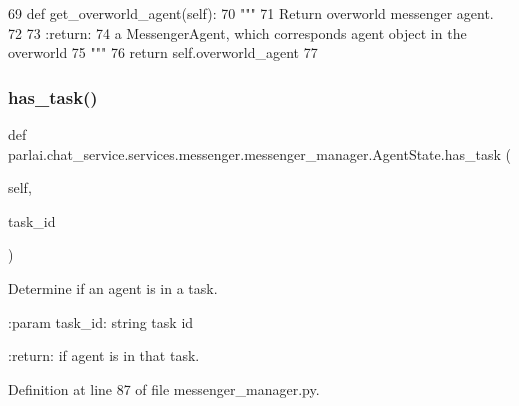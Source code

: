 \begin{DoxyCode}
69     \textcolor{keyword}{def }get\_overworld\_agent(self):
70         \textcolor{stringliteral}{"""}
71 \textcolor{stringliteral}{        Return overworld messenger agent.}
72 \textcolor{stringliteral}{}
73 \textcolor{stringliteral}{        :return:}
74 \textcolor{stringliteral}{            a MessengerAgent, which corresponds agent object in the overworld}
75 \textcolor{stringliteral}{        """}
76         \textcolor{keywordflow}{return} self.overworld\_agent
77 
\end{DoxyCode}
\mbox{\label{classparlai_1_1chat__service_1_1services_1_1messenger_1_1messenger__manager_1_1AgentState_a508037777019a09944a08bd3cc204dbb}} 
\subsubsection{\texorpdfstring{has\+\_\+task()}{has\_task()}}
{\footnotesize\ttfamily def parlai.\+chat\+\_\+service.\+services.\+messenger.\+messenger\+\_\+manager.\+Agent\+State.\+has\+\_\+task (\begin{DoxyParamCaption}\item[{}]{self,  }\item[{}]{task\+\_\+id }\end{DoxyParamCaption})}

\begin{DoxyVerb}Determine if an agent is in a task.

:param task_id:
    string task id

:return:
    if agent is in that task.
\end{DoxyVerb}
 

Definition at line 87 of file messenger\+\_\+manager.\+py.


